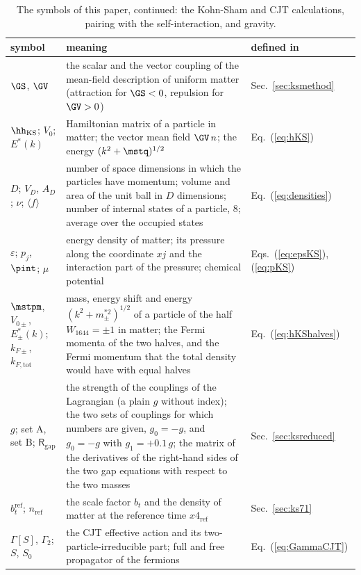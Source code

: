\begin{table}
\caption{\label{tab:symbols5}The symbols of this paper, continued: the Kohn-Sham and CJT
calculations, pairing with the self-interaction, and gravity.}
\begin{ruledtabular}
\begin{tabular}{p{}p{}p{}}
symbol & meaning & defined in \\
\hline
$\GS$, $\GV$ & the scalar and the vector coupling of the mean-field description of uniform matter (attraction for $\GS<0$, repulsion for $\GV>0$) & Sec.~\ref{sec:ksmethod} \\
$\hh_{\mathrm{KS}}$; $V_0$; $E^{*}(k)$ & Hamiltonian matrix of a particle in matter; the vector mean field $\GV\,n$; the energy $(k^{2}+\mstq)^{1/2}$ & Eq.~(\ref{eq:hKS}) \\
$D$; $V_D$, $A_D$; $\nu$; $\langle f\rangle$ & number of space dimensions in which the particles have momentum; volume and area of the unit ball in $D$ dimensions; number of internal states of a particle, 8; average over the occupied states & Eq.~(\ref{eq:densities}) \\
$\varepsilon$; $p_j$, $\pint$; $\mu$ & energy density of matter; its pressure along the coordinate $xj$ and the interaction part of the pressure; chemical potential & Eqs.~(\ref{eq:epsKS}), (\ref{eq:pKS}) \\
$\mstpm$, $V_{0\pm}$, $E^{*}_\pm(k)$; $k_{F\pm}$, $k_{F,\mathrm{tot}}$ & mass, energy shift and energy $(k^{2}+m_\pm^{*2})^{1/2}$ of a particle of the half $W_{1644}=\pm1$ in matter; the Fermi momenta of the two halves, and the Fermi momentum that the total density would have with equal halves & Eq.~(\ref{eq:hKShalves}) \\
$g$; set A, set B; $\mathsf R_{\mathrm{gap}}$ & the strength of the couplings of the Lagrangian (a plain $g$ without index); the two sets of couplings for which numbers are given, $g_0=-g$, and $g_0=-g$ with $g_1=+0.1\,g$; the matrix of the derivatives of the right-hand sides of the two gap equations with respect to the two masses & Sec.~\ref{sec:ksreduced} \\
$b_t^{\mathrm{ref}}$; $n_{\mathrm{ref}}$ & the scale factor $b_t$ and the density of matter at the reference time $x4_{\mathrm{ref}}$ & Sec.~\ref{sec:ks71} \\
$\Gamma[S]$, $\Gamma_2$; $S$, $S_0$ & the CJT effective action and its two-particle-irreducible part; full and free propagator of the fermions & Eq.~(\ref{eq:GammaCJT}) \\

\end{tabular}
\end{ruledtabular}
\end{table}

